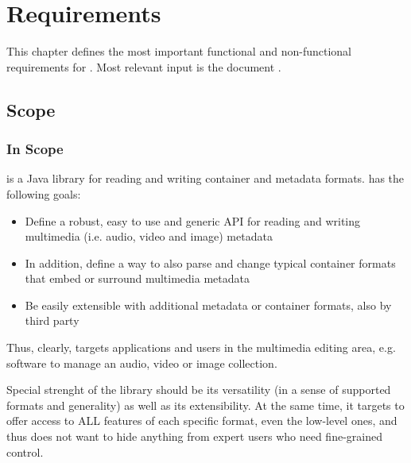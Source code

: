 
\part{Requirements}
\label{sec:Analyse}

This chapter defines the most important functional and non-functional requirements for \LibName{}.
Most relevant input is the document \cite{MC17}.


\chapter{Scope}


\section{In Scope}%
\label{sec:InScope}%

\LibName{} is a Java library for reading and writing container and metadata formats. \LibName{} has the following goals:
\begin{itemize}
\item Define a robust, easy to use and generic API for reading and writing multimedia (i.e. audio, video and image) metadata
\item In addition, define a way to also parse and change typical container formats that embed or surround multimedia metadata
\item Be easily extensible with additional metadata or container formats, also by third party
\end{itemize}

Thus, clearly, \LibName{} targets applications and users in the multimedia editing area, e.g. software to manage an audio, video or image collection.

Special strenght of the library should be its versatility (in a sense of supported formats and generality) as well as its extensibility. At the same time, it targets to offer access to ALL features of each specific format, even the low-level ones, and thus does not want to hide anything from expert users who need fine-grained control.

